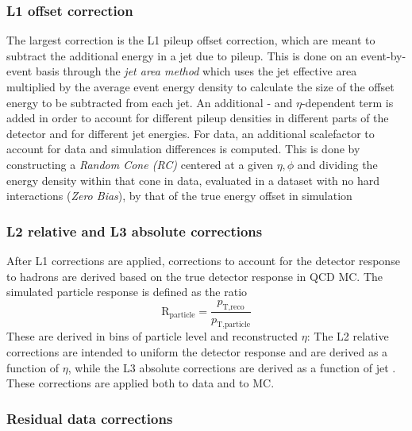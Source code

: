 \subsubsection{L1 offset correction}
The largest correction is the L1 pileup offset correction, which are meant to subtract the additional energy in a jet due to pileup. This is done on an event-by-event basis through the \textit{jet area method} which uses the jet effective area multiplied by the average event energy density to calculate the size of the offset energy to be subtracted from each jet. An additional \PT- and $\eta$-dependent term is added in order to account for different pileup densities in different parts of the detector and for different jet energies. For data, an additional scalefactor to account for data and simulation differences is computed. This is done by constructing a \textit{Random Cone (RC)} centered at a given $\eta,\phi$ and dividing the energy density within that cone in data, evaluated in a dataset with no hard interactions (\textit{Zero Bias}), by that of the true energy offset in simulation

\subsubsection{L2 relative and L3 absolute corrections}
After L1 corrections are applied, corrections to account for the detector response to hadrons are derived based on the true detector response in QCD MC. The simulated particle response is defined as the ratio
\begin{equation}
  \textrm{R}_{\textrm{particle}}=\frac{p_{\textrm{T,reco}}}{p_{\textrm{T,particle}}}
  \end{equation}
 These are derived in bins of particle level \PT and reconstructed $\eta$: The L2 relative corrections are intended to uniform the detector response and are derived as a function of $\eta$, while the L3 absolute corrections are derived as a function of jet \PT. These corrections are applied both to data and to MC.
 
\subsubsection{Residual data corrections}

